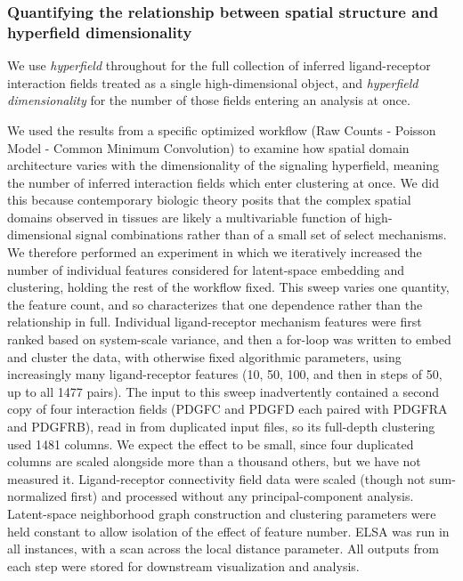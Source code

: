 \documentclass[10pt,letterpaper]{article}
\begin{document}
\subsubsection*{Quantifying the relationship between spatial structure and hyperfield dimensionality}

We use \textit{hyperfield} throughout for the full collection of inferred ligand-receptor interaction fields treated as a single high-dimensional object, and \textit{hyperfield dimensionality} for the number of those fields entering an analysis at once.

We used the results from a specific optimized workflow (Raw Counts - Poisson Model - Common Minimum Convolution) to examine how spatial domain architecture varies with the dimensionality of the signaling hyperfield, meaning the number of inferred interaction fields which enter clustering at once. We did this because contemporary biologic theory posits that the complex spatial domains observed in tissues are likely a multivariable function of high-dimensional signal combinations rather than of a small set of select mechanisms. We therefore performed an experiment in which we iteratively increased the number of individual features considered for latent-space embedding and clustering, holding the rest of the workflow fixed. This sweep varies one quantity, the feature count, and so characterizes that one dependence rather than the relationship in full. Individual ligand-receptor mechanism features were first ranked based on system-scale variance, and then a for-loop was written to embed and cluster the data, with otherwise fixed algorithmic parameters, using increasingly many ligand-receptor features (10, 50, 100, and then in steps of 50, up to all 1477 pairs). The input to this sweep inadvertently contained a second copy of four interaction fields (PDGFC and PDGFD each paired with PDGFRA and PDGFRB), read in from duplicated input files, so its full-depth clustering used 1481 columns. We expect the effect to be small, since four duplicated columns are scaled alongside more than a thousand others, but we have not measured it. Ligand-receptor connectivity field data were scaled (though not sum-normalized first) and processed without any principal-component analysis. Latent-space neighborhood graph construction and clustering parameters were held constant to allow isolation of the effect of feature number. ELSA was run in all instances, with a scan across the local distance parameter. All outputs from each step were stored for downstream visualization and analysis.
\end{document}

